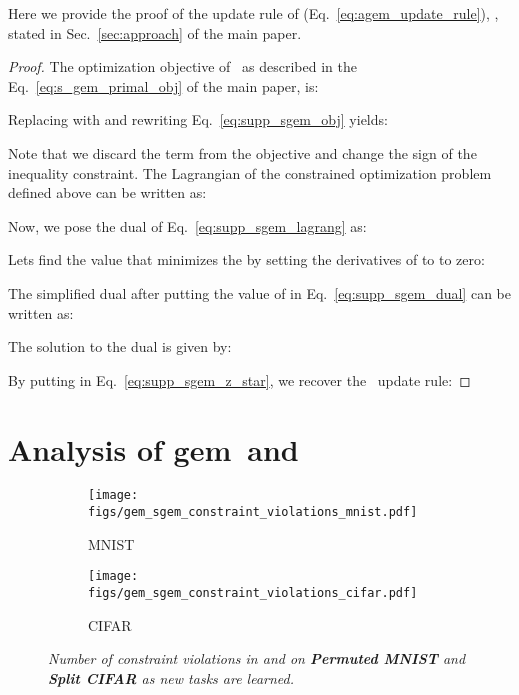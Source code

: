 Here we provide the proof of the update rule of \sgem (Eq.~\ref{eq:agem_update_rule}), , stated in Sec.~\ref{sec:approach} of the main paper.
\begin{proof}
The optimization objective of \sgem\, as described in the Eq.~\ref{eq:s_gem_primal_obj} of the main paper, is:

Replacing  with  and rewriting Eq.~\ref{eq:supp_sgem_obj} yields:

Note that we discard the term  from the objective and change the sign of the inequality constraint. The Lagrangian of the constrained optimization problem defined above can be written as:


Now, we pose the dual of Eq.~\ref{eq:supp_sgem_lagrang} as:


Lets find the value  that minimizes the  by setting the derivatives of  \wrt to  to zero:


The simplified dual after putting the value of  in Eq.~\ref{eq:supp_sgem_dual} can be written as:


The solution  to the dual is given by:


By putting  in Eq.~\ref{eq:supp_sgem_z_star}, we recover the \sgem\ update rule:

\end{proof}

\section{Analysis of gem\ and \sgem} \label{sec:gem_vs_sgem_abal}

\begin{figure}[tb]
	\begin{subfigure}{0.5\linewidth}
	\begin{center}
		\texttt{[image: figs/gem\_sgem\_constraint\_violations\_mnist.pdf]}
		\caption{\small MNIST}
	\end{center}
	\end{subfigure}\begin{subfigure}{0.5\linewidth}
	\begin{center}
		\texttt{[image: figs/gem\_sgem\_constraint\_violations\_cifar.pdf]}
		\caption{\small CIFAR}
	\end{center}
	\end{subfigure}\vspace{-3mm}
\caption{\em Number of constraint violations in \textbf{\gem} and \textbf{\sgem} on \textbf{Permuted MNIST} and \textbf{Split CIFAR} as new tasks are learned.}
	\label{fig:gem_vs_sgem_constrnt_violtn}
\end{figure}

